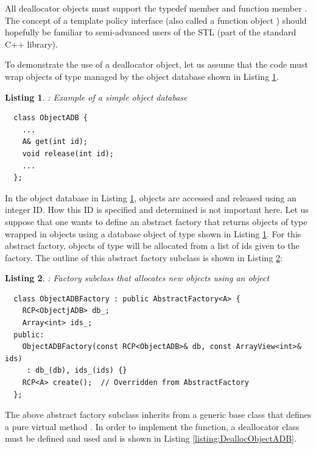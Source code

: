 \documentclass[pdf,ps2pdf,11pt]{SANDreport}
\newtheorem{listing}{Listing}
\begin{document}
All deallocator objects must support the typedef member {}
and function member {}.  The concept of a template
policy interface (also called a function object
\cite[Section 18.4]{stroustrup97}) should hopefully be familiar to
semi-advanced users of the STL (part of the standard C++ library).

To demonstrate the use of a deallocator object, let us assume that the
code must wrap objects of type {} managed by the object
database shown in Listing {}\ref{listing:ObjectADB}.


{}\begin{listing}: Example of a simple object database
\label{listing:ObjectADB}
{\small\begin{verbatim}
  class ObjectADB {
    ...
    A& get(int id);
    void release(int id);
    ...
  };
\end{verbatim}}
\end{listing}


In the object database in Listing {}\ref{listing:ObjectADB}, objects
are accessed and released using an integer ID.  How this ID is
specified and determined is not important here.  Let us suppose that
one wants to define an abstract factory that returns objects of type
{} wrapped in {} objects using a database object of
type {} shown in Listing {}\ref{listing:ObjectADB}.
For this abstract factory, objects of type {} will be allocated
from a list of ids given to the factory.  The outline of this abstract
factory subclass is shown in Listing {}\ref{listing:ObjectADBFactory}:


{}\begin{listing}: Factory subclass that allocates new objects using
an {} object
\label{listing:ObjectADBFactory}
{\small\begin{verbatim}
  class ObjectADBFactory : public AbstractFactory<A> {
    RCP<ObjectjADB> db_;
    Array<int> ids_;
  public:
    ObjectADBFactory(const RCP<ObjectADB>& db, const ArrayView<int>& ids)
     : db_(db), ids_(ids) {}
    RCP<A> create();  // Overridden from AbstractFactory
  };
\end{verbatim}}
\end{listing}


The above abstract factory subclass {} inherits
from a generic {} base class that defines a pure
virtual method {}.  In order to implement the
{} function, a deallocator class must be defined and
used and is shown in Listing {}\ref{listing:DeallocObjectADB}.
\end{document}
